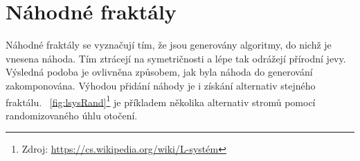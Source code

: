 \documentclass[thesis=B, czech]{FITthesis}[2019/03/06]
\begin{document}




%





\newpage

\section{Náhodné fraktály}

Náhodné fraktály se vyznačují tím, že jsou generovány algoritmy, do nichž je vnesena náhoda. Tím ztrácejí na symetričnosti a lépe tak odrážejí přírodní jevy. Výsledná podoba je ovlivněna způsobem, jak byla náhoda do generování zakomponována. Výhodou přidání náhody je i získání alternativ stejného fraktálu. \figurename~\ref{fig:lsysRand}\footnote{Zdroj: \url{https://cs.wikipedia.org/wiki/L-systém}} je příkladem několika alternativ stromů pomocí randomizovaného úhlu otočení.
\end{document}
